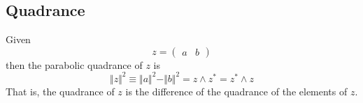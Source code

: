 \subsection{Quadrance}
Given
\begin{equation}
    z = \begin{pmatrix}
        a & b
    \end{pmatrix}
\end{equation}
then the parabolic quadrance of $z$ is
\begin{equation}
    \Vert z \Vert^{2} \equiv \Vert a \Vert^{2} - \Vert b \Vert^{2} = z \wedge z^{\ast} = z^{\ast} \wedge z
\end{equation}
That is, the quadrance of $z$ is the difference of the quadrance of the elements of $z$.